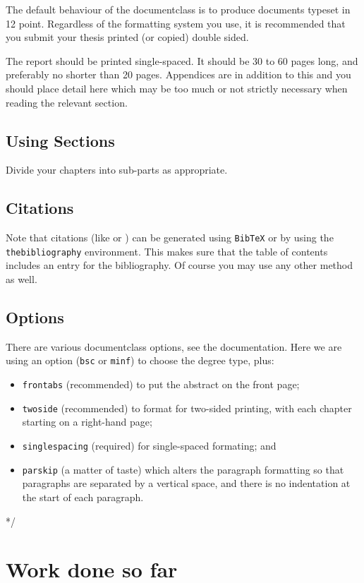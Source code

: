 \documentclass[bsc,frontabs,singlespacing,parskip]{infthesis} %
\begin{document}
The default behaviour of the documentclass is to produce documents typeset in
12 point.  Regardless of the formatting system you use, 
it is recommended that you submit your thesis printed (or copied) 
double sided.

The report should be printed single-spaced.
It should be 30 to 60 pages long, and preferably no shorter than 20 pages.
Appendices are in addition to this and you should place detail
here which may be too much or not strictly necessary when reading the relevant section.

\section{Using Sections}

Divide your chapters into sub-parts as appropriate.

\section{Citations}

Note that citations 
(like \cite{P1} or \cite{P2})
can be generated using {\tt BibTeX} or by using the
{\tt thebibliography} environment. This makes sure that the
table of contents includes an entry for the bibliography.
Of course you may use any other method as well.

\section{Options}

There are various documentclass options, see the documentation.  Here we are
using an option ({\tt bsc} or {\tt minf}) to choose the degree type, plus:
\begin{itemize}
\item {\tt frontabs} (recommended) to put the abstract on the front page;
\item {\tt twoside} (recommended) to format for two-sided printing, with
  each chapter starting on a right-hand page;
\item {\tt singlespacing} (required) for single-spaced formating; and
\item {\tt parskip} (a matter of taste) which alters the paragraph formatting so that
paragraphs are separated by a vertical space, and there is no
indentation at the start of each paragraph.
\end{itemize}
*/


\chapter{Work done so far}
\end{document}
